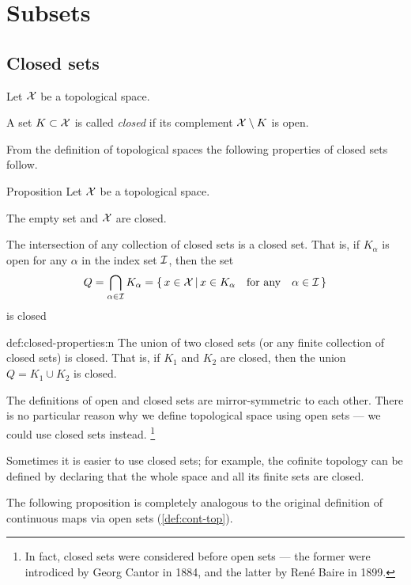 \chapter{Subsets}

\section{Closed sets}

Let $\mathcal{X}$ be a topological space. 

A set $K\subset \mathcal{X}$ is called \emph{closed} if its complement $\mathcal{X}\setminus K$ is open.

From the definition of topological spaces the following properties of closed sets follow.

\begin{thm}{Proposition}\label{prop:closed-properties}
Let $\mathcal{X}$ be a topological space. 
\begin{subthm}
 The empty set and $\mathcal{X}$ are closed.
\end{subthm}

\begin{subthm}
 The intersection of any collection of closed sets is a closed set.
That is, if $K_\alpha$ is open for any $\alpha$ in the index set $\mathcal{I}$,
then the set
\[Q=\bigcap_{\alpha\in \mathcal{I}} K_\alpha
=
\left\{\,{x\in \mathcal{X}}\,\middle|\,{x\in K_\alpha\quad\text{for any}\quad\alpha\in \mathcal{I}}\,\right\}\]
is closed
\end{subthm}

\begin{subthm}{def:closed-properties:n}
The union of two closed sets (or any finite collection of closed sets) is closed.  
That is,  if $K_1$ and $K_2$ are closed, then the union $Q=K_1 \cup K_2$ is closed. 
\end{subthm}

\end{thm}

The definitions of open and closed sets are mirror-symmetric to each other.
There is no particular reason why we define topological space using open sets --- we could use closed sets instead.%
\footnote{In fact, closed sets were considered before open sets --- the former were introdiced by Georg Cantor in 1884, and the latter by René Baire in 1899.}

Sometimes it is easier to use closed sets; 
for example, the cofinite topology can be defined by declaring that the whole space and all its finite sets are closed.

The following proposition is completely analogous to the original definition of continuous maps via open sets (\ref{def:cont-top}). 

